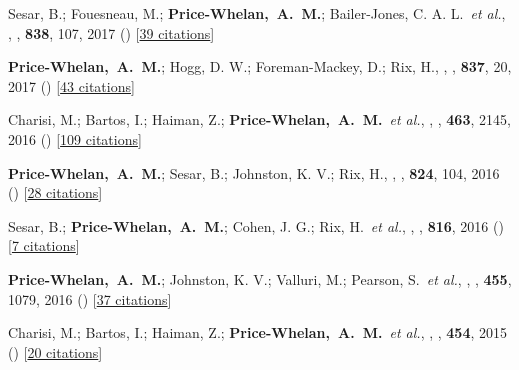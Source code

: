 \item[{\color{deemph}\scriptsize25}]Sesar, B.; Fouesneau, M.; \textbf{Price-Whelan,~A.~M.}; Bailer-Jones, C. A. L.~\textit{et al.}, , \apj, \textbf{838}, 107, 2017 () [\href{http://adsabs.harvard.edu/abs/2017ApJ...838..107S}{39 citations}]

\item[{\color{deemph}\scriptsize24}]\textbf{Price-Whelan,~A.~M.}; Hogg, D. W.; Foreman-Mackey, D.; Rix, H., , \apj, \textbf{837}, 20, 2017 () [\href{http://adsabs.harvard.edu/abs/2017ApJ...837...20P}{43 citations}]

\item[{\color{deemph}\scriptsize23}]Charisi, M.; Bartos, I.; Haiman, Z.; \textbf{Price-Whelan,~A.~M.}~\textit{et al.}, , \mnras, \textbf{463}, 2145, 2016 () [\href{http://adsabs.harvard.edu/abs/2016MNRAS.463.2145C}{109 citations}]

\item[{\color{deemph}\scriptsize22}]\textbf{Price-Whelan,~A.~M.}; Sesar, B.; Johnston, K. V.; Rix, H., , \apj, \textbf{824}, 104, 2016 () [\href{http://adsabs.harvard.edu/abs/2016ApJ...824..104P}{28 citations}]

\item[{\color{deemph}\scriptsize21}]Sesar, B.; \textbf{Price-Whelan,~A.~M.}; Cohen, J. G.; Rix, H.~\textit{et al.}, , \apj, \textbf{816}, 2016 () [\href{http://adsabs.harvard.edu/abs/2016ApJ...816L...4S}{7 citations}]

\item[{\color{deemph}\scriptsize20}]\textbf{Price-Whelan,~A.~M.}; Johnston, K. V.; Valluri, M.; Pearson, S.~\textit{et al.}, , \mnras, \textbf{455}, 1079, 2016 () [\href{http://adsabs.harvard.edu/abs/2016MNRAS.455.1079P}{37 citations}]

\item[{\color{deemph}\scriptsize19}]Charisi, M.; Bartos, I.; Haiman, Z.; \textbf{Price-Whelan,~A.~M.}~\textit{et al.}, , \mnras, \textbf{454}, 2015 () [\href{http://adsabs.harvard.edu/abs/2015MNRAS.454L..21C}{20 citations}]

